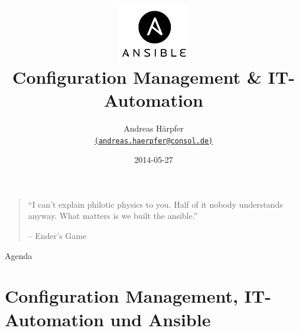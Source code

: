 
\title{\includegraphics[height=2.5cm]{files/ansible-logo-2.png}\\[1ex]
       \normalsize{Configuration Management \&{} IT-Automation}}
\author[Andreas Härpfer]{Andreas Härpfer \\
  {\scriptsize \href{mailto:andreas.haerpfer@consol.de}
  	            {\nolinkurl{(andreas.haerpfer@consol.de)}}}}
\date{2014-05-27}

\subject{Ansible -- Configuration Management \&{} IT-Automation}






\begin{frame}[plain]
  \titlepage
\end{frame}

\begin{frame}[plain]
  \begin{quote}
  {\Large ``I can't explain philotic physics to you. Half of it nobody
  understands anyway. What matters is we built the ansible.''\par}

  \vspace{2ex}
  \hfill -- Ender's Game
  \end{quote}
\end{frame}

\begin{frame}{Agenda}
  \tableofcontents
\end{frame}

\section{Configuration Management, IT-Automation und Ansible}

